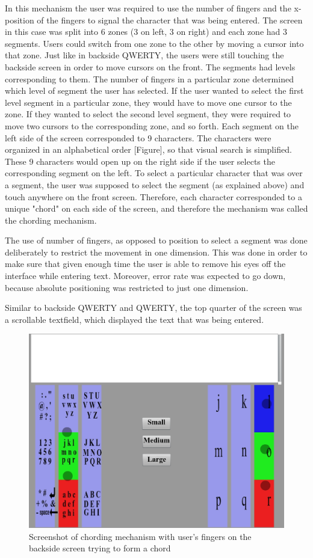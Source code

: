 In this mechanism the user was required to use the number of fingers
and the x-position of the fingers to signal the character that was
being entered. The screen in this case was split into 6 zones (3 on
left, 3 on right) and each zone had 3 segments. Users could switch
from one zone to the other by moving a cursor into that zone. Just
like in backside QWERTY, the users were still touching the backside
screen in order to move cursors on the front. The segments had levels
corresponding to them. The number of fingers in a particular zone
determined which level of segment the user has selected. If the user
wanted to select the first level segment in a particular zone, they
would have to move one cursor to the zone. If they wanted to select
the second level segment, they were required to move two cursors to
the corresponding zone, and so forth. Each segment on the left side of
the screen corresponded to 9 characters. The characters were organized
in an alphabetical order [Figure], so that visual search is
simplified. These 9 characters would open up on the right side if the
user selects the corresponding segment on the left. To select a
particular character that was over a segment, the user was supposed to
select the segment (as explained above) and touch anywhere on the
front screen. Therefore, each character corresponded to a unique
"chord" on each side of the screen, and therefore the mechanism was
called the chording mechanism.

The use of number of fingers, as opposed to position to select a
segment was done deliberately to restrict the movement in one
dimension. This was done in order to make sure that given enough time
the user is able to remove his eyes off the interface while entering
text. Moreover, error rate was expected to go down, because absolute
positioning was restricted to just one dimension.

Similar to backside QWERTY and QWERTY, the top quarter of the screen
was a scrollable textfield, which displayed the text that was being
entered.

\begin{figure}
    \includegraphics[scale=0.45]{Figures/chording.eps} 
    \caption{Screenshot of chording mechanism with user's fingers on
      the backside screen trying to form a chord}
\end{figure} 
